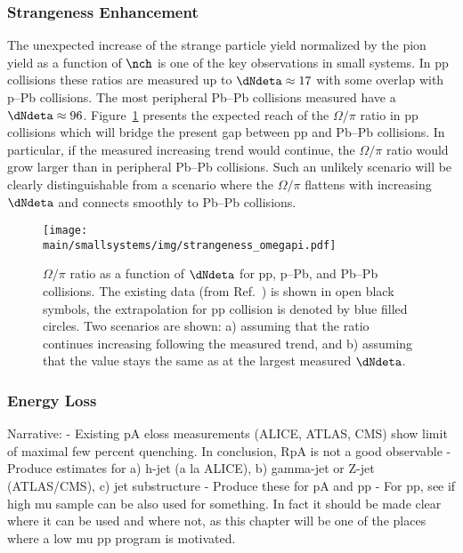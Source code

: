 \documentclass[../report.tex]{subfiles}
\providecommand{\main}{..}
\begin{document}
\subsubsection{Strangeness Enhancement}

The unexpected increase of the strange particle yield normalized by the pion yield as a function of $\nch$ is one of the key observations in small systems. In pp collisions these ratios are measured up to $\dNdeta \approx 17$ with some overlap with p--Pb collisions. The most peripheral Pb--Pb collisions measured have a $\dNdeta \approx 96$. Figure~\ref{fig:smallsystems_strangeness_omega_pi} presents the expected reach of the $\Omega/\pi$ ratio in pp collisions which will bridge the present gap between pp and Pb--Pb collisions. In particular, if the measured increasing trend would continue, the $\Omega/\pi$ ratio would grow larger than in peripheral Pb--Pb collisions. Such an unlikely scenario will be clearly distinguishable from a scenario where the $\Omega/\pi$ flattens with increasing $\dNdeta$ and connects smoothly to Pb--Pb collisions. 

\begin{figure}[ht]
\centering
\texttt{[image: \\main/smallsystems/img/strangeness\_omegapi.pdf]}

\caption{$\Omega/\pi$ ratio as a function of $\dNdeta$ for pp, p--Pb, and Pb--Pb collisions. The existing data (from Ref.~\cite{ALICE:2017jyt}) is shown in open black symbols, the extrapolation for pp collision is denoted by blue filled circles. Two scenarios are shown: a) assuming that the ratio continues increasing following the measured trend, and b) assuming that the value stays the same as at the largest measured $\dNdeta$.}
\label{fig:smallsystems_strangeness_omega_pi}
\end{figure}

\subsubsection{Energy Loss}

Narrative: 
- Existing pA eloss measurements (ALICE, ATLAS, CMS) show limit of maximal few percent quenching. In conclusion, RpA is not a good observable
- Produce estimates for a) h-jet (a la ALICE), b) gamma-jet or Z-jet (ATLAS/CMS), c) jet substructure
- Produce these for pA and pp
- For pp, see if high mu sample can be also used for something. In fact it should be made clear where it can be used and where not, as this chapter will be one of the places where a low mu pp program is motivated.
\end{document}
